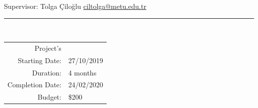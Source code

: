 \begin{titlepage}
\begin{center}
    Supervisor: Tolga Çiloğlu \href{mailto:ciltolga@metu.edu.tr}{{\color{blue} ciltolga@metu.edu.tr}}
\end{center}

\rule{\linewidth}{0.2 mm} \\[0.2 cm]

\begin{table}[h]
\centering
\begin{tabular}{r l} 
 Project's &    \\
 Starting Date: & 27/10/2019   \\
 Duration: & 4 months   \\
 Completion Date: & 24/02/2020  \\
 Budget: & \$200   \\
\end{tabular}
\label{table:1}
\end{table}
\end{titlepage}